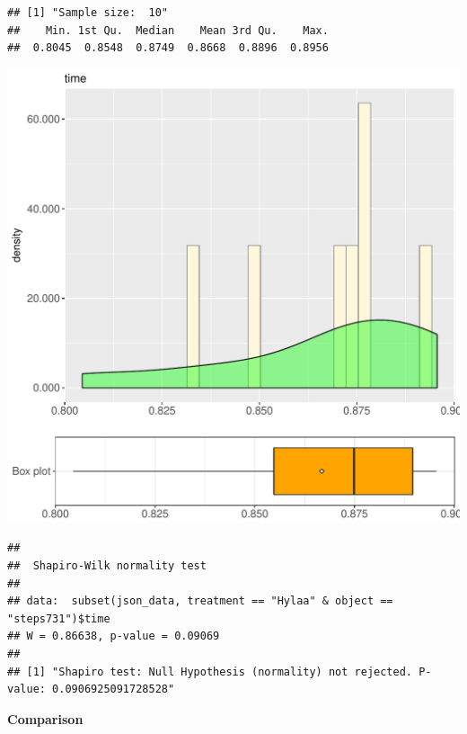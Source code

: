\documentclass{article}\usepackage[]{graphicx}\usepackage[]{color}
\makeatletter
\def\maxwidth{ %
  \ifdim\Gin@nat@width>\linewidth
    \linewidth
  \else
    \Gin@nat@width
  \fi
}
\newenvironment{kframe}{%
 \def\at@end@of@kframe{}%
 \ifinner\ifhmode%
  \def\at@end@of@kframe{\end{minipage}}%
  \begin{minipage}{\columnwidth}%
 \fi\fi%
 \def\FrameCommand##1{\hskip\@totalleftmargin \hskip-\fboxsep
 \colorbox{shadecolor}{##1}\hskip-\fboxsep
     \hskip-\linewidth \hskip-\@totalleftmargin \hskip\columnwidth}%
 \MakeFramed {\advance\hsize-\width
   \@totalleftmargin\z@ \linewidth\hsize
   \@setminipage}}%
 {\par\unskip\endMakeFramed%
 \at@end@of@kframe}
\newenvironment{knitrout}{}{} %
\makeatother
\begin{document}
\begin{knitrout}
\color{fgcolor}\begin{kframe}
\begin{verbatim}
## [1] "Sample size:  10"
##    Min. 1st Qu.  Median    Mean 3rd Qu.    Max. 
##  0.8045  0.8548  0.8749  0.8668  0.8896  0.8956
\end{verbatim}
\end{kframe}
\includegraphics[width=\maxwidth]{figure/RH2_Hylaa_steps731-1} 
\begin{kframe}\begin{verbatim}
## 
## 	Shapiro-Wilk normality test
## 
## data:  subset(json_data, treatment == "Hylaa" & object == "steps731")$time
## W = 0.86638, p-value = 0.09069
## 
## [1] "Shapiro test: Null Hypothesis (normality) not rejected. P-value: 0.0906925091728528"
\end{verbatim}
\end{kframe}
\end{knitrout}
  
 \textbf{Comparison}
  
\end{document}
